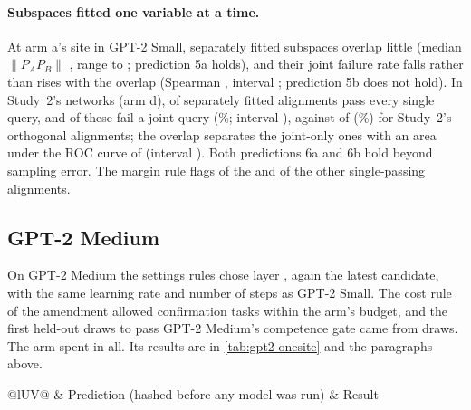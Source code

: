 \paragraph{Subspaces fitted one variable at a time.} At arm a's site in GPT-2 Small, separately fitted subspaces
overlap little (median $\|P_AP_B\|$ \SepOverlapMedian, range \SepOverlapMin{} to \SepOverlapMax; prediction 5a holds),
and their joint failure rate falls rather than rises with the overlap (Spearman \SepSpearman, interval
\SepSpearmanCI; prediction 5b does not hold). In Study~2's \TrnNetworks{} networks (arm d), \DPerfect{} of \DAlign{}
separately fitted alignments pass every single query, and \DJointOnly{} of these fail a joint query (\DShare\%;
interval \DShareCI), against \TrnPerfectJointFail{} of \TrnPerfect{} (\TrnPerfectShare\%) for Study~2's orthogonal
alignments; the overlap separates the joint-only ones with an area under the ROC curve of \DAuroc{} (interval
\DAurocCI). Both predictions 6a and 6b hold beyond sampling error. The margin rule flags \DFlagged{} of the
\DJointOnly{} and \DFlaggedOther{} of the other single-passing alignments.

\subsection{GPT-2 Medium}\label{sec:gpt2-medium}

On GPT-2 Medium the settings rules chose layer \LayerMedium, again the latest candidate, with the same learning rate
and number of steps as GPT-2 Small. The cost rule of the amendment allowed \NTasksMedium{} confirmation tasks within
the arm's budget, and the first \GatePassedMedium{} held-out draws to pass GPT-2 Medium's competence gate came from
\GateDrawnMedium{} draws. The arm spent \ArmSpent{} in all. Its results are in \cref{tab:gpt2-onesite} and the
paragraphs above.

\begin{table}[t]
\centering
\small
\begin{tabularx}{\linewidth}{@{}lUV@{}}
\toprule
& Prediction (hashed before any model was run) & Result \\
\midrule
{}
\bottomrule
\end{tabularx}
\caption{Study~4: every prediction, scored on the confirmation tasks. ``Beyond sampling error'' means that the whole
95\% interval lies on the predicted side or, for a failed prediction, on the other side. GPT-2 Medium's predictions
(1--3) were hashed with Amendment 2, before any of its computation.}
\label{tab:gpt2-predictions}
\end{table}
